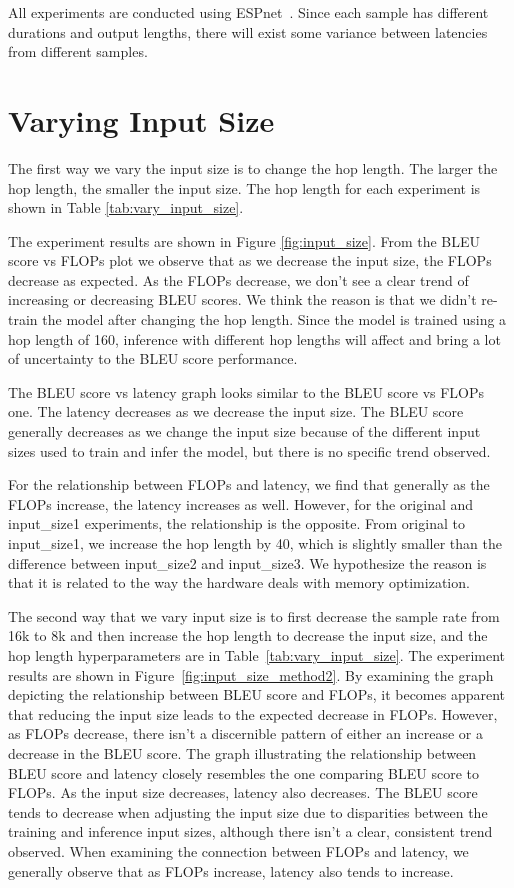 \documentclass[11pt]{article}
\begin{document}
All experiments are conducted using ESPnet~\cite{espnet,inaguma2020espnet}. Since each sample has different durations and output lengths, there will exist some variance between latencies from different samples.

\section{Varying Input Size}
The first way we vary the input size is to change the hop length. The larger the hop length, the smaller the input size. The hop length for each experiment is shown in Table \ref{tab:vary_input_size}. 

The experiment results are shown in Figure \ref{fig:input_size}. From the BLEU score vs FLOPs plot we observe that as we decrease the input size, the FLOPs decrease as expected. As the FLOPs decrease, we don't see a clear trend of increasing or decreasing BLEU scores. We think the reason is that we didn't re-train the model after changing the hop length. Since the model is trained using a hop length of 160, inference with different hop lengths will affect and bring a lot of uncertainty to the BLEU score performance. 

The BLEU score vs latency graph looks similar to the BLEU score vs FLOPs one. The latency decreases as we decrease the input size. The BLEU score generally decreases as we change the input size because of the different input sizes used to train and infer the model, but there is no specific trend observed. 

For the relationship between FLOPs and latency, we find that generally as the FLOPs increase, the latency increases as well. However, for the original and input\_size1 experiments, the relationship is the opposite. From original to input\_size1, we increase the hop length by 40, which is slightly smaller than the difference between input\_size2 and input\_size3. We hypothesize the reason is that it is related to the way the hardware deals with memory optimization. 

The second way that we vary input size is to first decrease the sample rate from 16k to 8k and then increase the hop length to decrease the input size, and the hop length hyperparameters are in Table~\ref{tab:vary_input_size}. The experiment results are shown in Figure~\ref{fig:input_size_method2}. By examining the graph depicting the relationship between BLEU score and FLOPs, it becomes apparent that reducing the input size leads to the expected decrease in FLOPs. However, as FLOPs decrease, there isn't a discernible pattern of either an increase or a decrease in the BLEU score. The graph illustrating the relationship between BLEU score and latency closely resembles the one comparing BLEU score to FLOPs. As the input size decreases, latency also decreases. The BLEU score tends to decrease when adjusting the input size due to disparities between the training and inference input sizes, although there isn't a clear, consistent trend observed. When examining the connection between FLOPs and latency, we generally observe that as FLOPs increase, latency also tends to increase.
\end{document}
